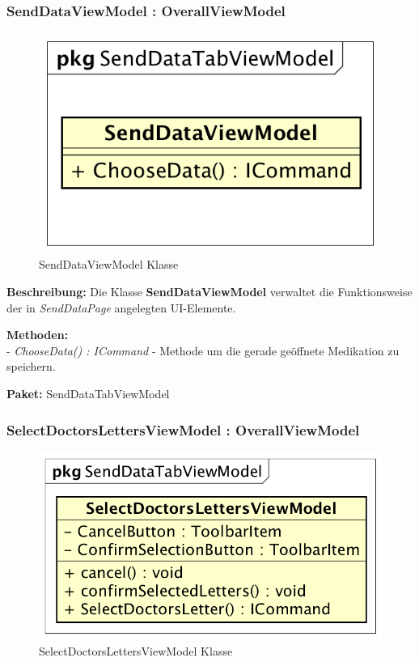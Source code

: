 \documentclass[a4paper]{scrreprt}
\begin{document}
\subsubsection{SendDataViewModel : OverallViewModel}
\begin{figure}[H]
\centering
\includegraphics[width=0.45\textheight]{graphics/Klassendiagramme/ViewModel/SendDataViewModel.png}
\caption{SendDataViewModel Klasse}
\end{figure}

\textbf{Beschreibung:} Die Klasse \textbf{SendDataViewModel} verwaltet die Funktionsweise der in \textit{SendDataPage} angelegten UI-Elemente.

\textbf{Methoden:}\\
- \textit{ChooseData() : ICommand} - Methode um die gerade geöffnete Medikation zu speichern.

\textbf{Paket:} SendDataTabViewModel

\subsubsection{SelectDoctorsLettersViewModel : OverallViewModel}
\begin{figure}[H]
\centering
\includegraphics[width=0.45\textheight]{graphics/Klassendiagramme/ViewModel/SelectDoctorsLettersViewModel.png}
\caption{SelectDoctorsLettersViewModel Klasse}
\end{figure}
\end{document}
